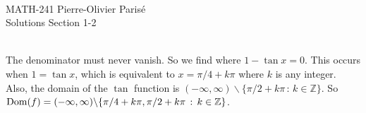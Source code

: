 


	\noindent \hrulefill \\
	MATH-241 \hfill Pierre-Olivier Paris{\'e}\\
	Solutions Section 1-2 \hfill \semester \\\vspace*{-1cm}
	
	\noindent\hrulefill
	
	\spc
	
	\\
	The denominator must never vanish. So we find where $1 - \tan x = 0$. This occurs when $1 = \tan x$, which is equivalent to $x = \pi/4 + k \pi$ where $k$ is any integer. Also, the domain of the $\tan$ function is $(- \infty , \infty ) \backslash \{ \pi/2 + k \pi \, : \, k \in \mathbb{Z} \}$. So $\operatorname{Dom} (f) = (-\infty , \infty ) \backslash \{ \pi/4 + k \pi , \pi/2 + k \pi \, : \, k \in \mathbb{Z} \}$.
	
	
	

